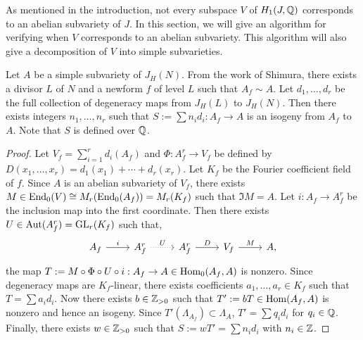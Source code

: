 \documentclass{article}
\begin{document}
As mentioned in the introduction, not every subspace $V$ of $H_1(J, \mathbb{Q})$
corresponds to an abelian subvariety of $J$. In this section, we will give an
algorithm for verifying when $V$ corresponds to an abelian subvariety. This
algorithm will also give a decomposition of $V$ into simple subvarieties.


\begin{proposition}
	\label{prop:integral_degen}
	Let $A$ be a simple subvariety of $J_H(N)$. From the work of Shimura,
	there exists a divisor $L$ of $N$ and a newform $f$ of level $L$ such that
	$A_f \sim A$. Let $d_1,\ldots,d_r$ be the full collection of degeneracy
	maps from $J_H(L)$ to $J_H(N)$. Then there exists integers $n_1,\ldots,n_r$
	such that $S:=\sum n_i d_i: A_f\to A$ is an isogeny from $A_f$ to $A$. Note
	that $S$ is defined over $\mathbb{Q}$.
\end{proposition}
\begin{proof}
	Let $V_f=\sum_{i=1} ^r d_i(A_f)$ and $\Phi:A_f ^r \to V_f$ be defined by
	$D(x_1,\ldots,x_r) = d_1(x_1)+\cdots+d_r(x_r)$. Let $K_f$ be the Fourier
	coefficient field of $f$. Since $A$ is an abelian subvariety of $V_f$, there
	exists $M\in \operatorname{End}_0(V)\cong M_r(\operatorname{End}_0(A_f)) = M_r (K_f)$ such that $\Im M
		= A$. Let $i:A_f\to A_f ^r$ be the inclusion map into the first coordinate.
	Then there exists $U\in \operatorname{Aut}(A_f ^r)=\operatorname{GL}_r (K_f)$ such that,
	\[
		\begin{tikzcd}
			A_f \arrow[r,"i"] &
			A_f ^r \arrow[r, dotted, "U"] &
			A_f ^r \arrow[r, "D"] &
			V_f \arrow[r, "M"] &
			A,
		\end{tikzcd}
	\]
	the map $T:=M \circ \Phi \circ U\circ i:A_f\to A\in \operatorname{Hom}_0(A_f, A)$ is
	nonzero. Since degeneracy maps are $K_f$-linear, there exists coefficients
	$a_1,\ldots,a_r\in K_f$ such that $T = \sum a_i d_i$. Now there exists
	$b\in \mathbb{Z}_{>0}$ such that $T':=bT\in \operatorname{Hom}(A_f, A)$ is nonzero and hence an
	isogeny. Since $T'(\Lambda_{A_f})\subset \Lambda_A$, $T'=\sum q_i d_i$
	for $q_i\in \mathbb{Q}$. Finally, there exists $w\in \mathbb{Z}_{>0}$ such that
	$S:=wT'=\sum n_i d_i$ with $n_i\in \mathbb{Z}$.
\end{proof}
\end{document}

